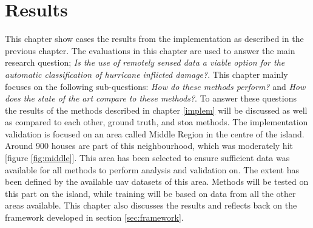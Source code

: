 \chapter{Results} \label{result}
This chapter show cases the results from the implementation as described in the previous chapter. The evaluations in this chapter are used to answer the main research question; \textit{Is the use of remotely sensed data a viable option for the automatic classification of hurricane inflicted damage?}. This chapter mainly focuses on the following sub-questions: \textit{How do these methods perform?} and \textit{How does the state of the art compare to these methods?}. To answer these questions the results of the methods described in chapter \ref{implem} will be discussed as well as compared to each other, ground truth, and \ac{stoa} methods. The implementation validation is focused on an area called Middle Region in the centre of the island. Around 900 houses are part of this neighbourhood, which was moderately hit [figure \ref{fig:middle}]. This area has been selected to ensure sufficient data was available for all methods to perform analysis and validation on. The extent has been defined by the available \ac{uav} datasets of this area. Methods will be tested on this part on the island, while training will be based on data from all the other areas available. This chapter also discusses the results and reflects back on the framework developed in section \ref{sec:framework}.

